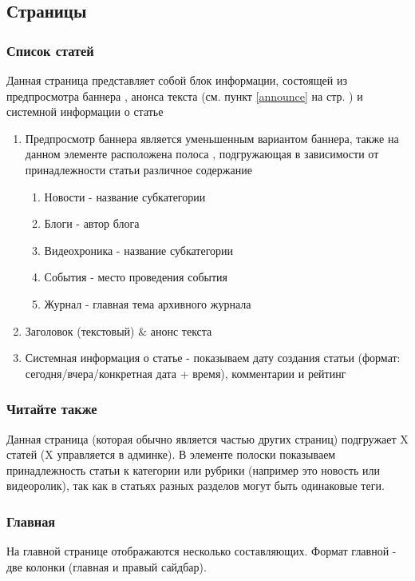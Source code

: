 \documentclass[DIV=calc, paper=a4, fontsize=11pt]{scrartcl} %
\begin{document}
\begin{enumerate}
\end{enumerate}

\subsection{Страницы}
\subsubsection{Список статей}
Данная страница представляет собой блок информации, состоящей из предпросмотра баннера , анонса текста (см. пункт \ref{announce} на стр. \pageref{announce}) и системной информации о статье
\begin{enumerate}
    \item Предпросмотр баннера является уменьшенным вариантом баннера, также на данном элементе расположена полоса \label{whiteline}, подгружающая в зависимости от принадлежности статьи различное содержание
    \begin{enumerate}
        \item Новости - название субкатегории
        \item Блоги - автор блога 
        \item Видеохроника - название субкатегории
        \item События - место проведения события
        \item Журнал - главная тема архивного журнала
    \end{enumerate}
    \item Заголовок (текстовый) \& анонс текста
    \item Системная информация о статье - показываем дату создания статьи (формат: сегодня/вчера/конкретная дата + время), комментарии и рейтинг
\end{enumerate}

\subsubsection{Читайте также}
Данная страница (которая обычно является частью других страниц) подгружает X статей (X управляется в админке). В элементе полоски показываем принадлежность статьи к категории или рубрики (например это новость или видеоролик), так как в статьях разных разделов могут быть одинаковые теги. 

\subsubsection{Главная}
На главной странице отображаются несколько составляющих. Формат главной - две колонки (главная и правый сайдбар).
\end{document}
